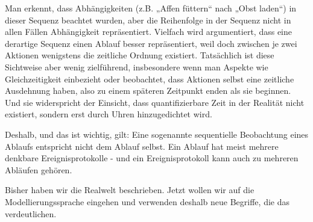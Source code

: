 Man erkennt, 
dass Abhängigkeiten (z.B. „Affen füttern“ nach „Obst laden“) in dieser Sequenz beachtet wurden, aber die Reihenfolge in der Sequenz nicht in allen Fällen Abhängigkeit repräsentiert. Vielfach wird argumentiert, dass eine derartige Sequenz einen Ablauf besser repräsentiert, weil doch zwischen je zwei Aktionen wenigstens die zeitliche Ordnung existiert. Tatsächlich ist diese Sichtweise aber wenig zielführend, insbesondere wenn man Aspekte wie Gleichzeitigkeit einbezieht oder beobachtet, dass Aktionen selbst eine zeitliche Ausdehnung haben, also zu einem späteren Zeitpunkt enden als sie beginnen. Und sie widerspricht der Einsicht, dass quantifizierbare Zeit in der Realität nicht existiert, sondern erst durch Uhren hinzugedichtet wird.

Deshalb, und das ist wichtig, gilt: Eine sogenannte sequentielle Beobachtung eines Ablaufs entspricht nicht dem Ablauf selbst. Ein Ablauf hat meist mehrere denkbare Ereignisprotokolle - und ein Ereignisprotokoll kann auch zu mehreren Abläufen gehören.



Bisher haben wir die Realwelt beschrieben. Jetzt wollen wir auf die Modellierungssprache eingehen und verwenden deshalb neue Begriffe, die das verdeutlichen.



